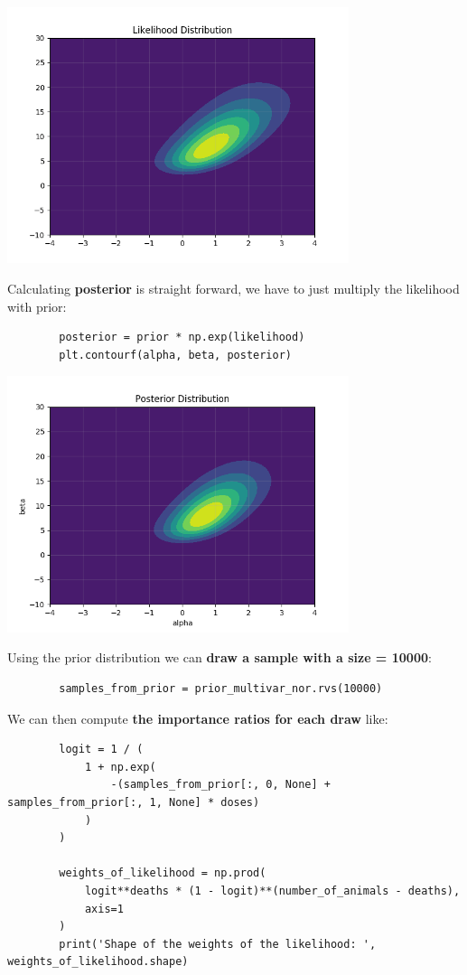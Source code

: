 \documentclass[11pt,a4paper,english]{article}
\begin{document}
      \includegraphics[width=10cm]{2_likelihood_distribution.png}

      Calculating \textbf{posterior} is straight forward, we have to just multiply the likelihood
      with prior:
      \begin{verbatim}
        posterior = prior * np.exp(likelihood)
        plt.contourf(alpha, beta, posterior)
      \end{verbatim}

      \includegraphics[width=10cm]{3_posterior_distribution.png}

      Using the prior distribution we can \textbf{draw a sample with a size = 10000}:
      \begin{verbatim}
        samples_from_prior = prior_multivar_nor.rvs(10000)
      \end{verbatim}

      We can then compute \textbf{the importance ratios for each draw} like:
      \begin{verbatim}
        logit = 1 / (
            1 + np.exp(
                -(samples_from_prior[:, 0, None] + samples_from_prior[:, 1, None] * doses)
            )
        )

        weights_of_likelihood = np.prod(
            logit**deaths * (1 - logit)**(number_of_animals - deaths),
            axis=1
        )
        print('Shape of the weights of the likelihood: ', weights_of_likelihood.shape)
      \end{verbatim}
\end{document}

